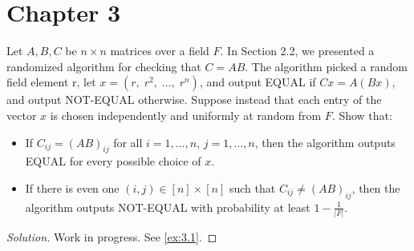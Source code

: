 \chapter{Chapter 3}

\begin{exercise}\label{ex:3.1}
    Let $A,B,C$ be $n \times n$ matrices over a field $F$. In Section 2.2, we presented a randomized algorithm for checking that $C = AB$. The algorithm picked a random field element r, let $x = (r,\; r^2,\; \ldots,\; r^n)$, and output EQUAL if $Cx = A(Bx)$, and output NOT-EQUAL otherwise.
    Suppose instead that each entry of the vector $x$ is chosen independently and uniformly at random from $F$. 
    Show that:
    \begin{itemize}
        \item If $C_{ij} = (AB)_{ij}$ for all $i = 1, \ldots, n$, $j = 1, \ldots, n$,
            then the algorithm outputs EQUAL for every possible choice of $x$.
        \item If there is even one $(i,j) \in [n] \times [n]$ such that
            $C_{ij} \neq (AB)_{ij}$, then the algorithm outputs NOT-EQUAL with
            probability at least $1 - \frac{1}{|F|}$.
    \end{itemize}
\end{exercise}

\begin{proof}[Solution]
  Work in progress. See \cref{ex:3.1}.
\end{proof}
